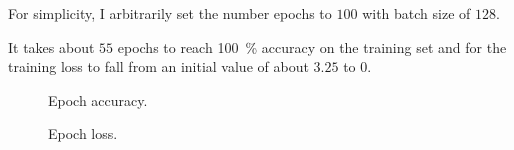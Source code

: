 \documentclass[a4paper]{exam}
\begin{document}
\begin{questions}
    For simplicity, I arbitrarily set the number epochs to $100$ with batch size of $128$.

    It takes about $55$ epochs to reach \qty{100}{\percent} accuracy on the training set and for the training loss to fall from an initial value of about $3.25$ to $0$.

    \begin{figure}[hb]
        \centering
        
        \caption{Epoch accuracy.}
        \label{fig:epoch_accuracy}
    \end{figure}

    \begin{figure}[htb]
        \centering
        
        \caption{Epoch loss.}
        \label{fig:epoch_loss}
    \end{figure}
\end{questions}
\end{document}
